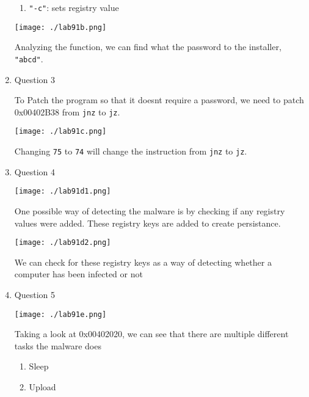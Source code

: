 \documentclass[11pt]{article}
\begin{document}
\begin{enumerate}
\begin{enumerate}
\item \texttt{"-c"}: sets registry value
\end{enumerate}

\begin{center}
\texttt{[image: ./lab91b.png]}
\end{center}

Analyzing the function, we can find what the password to the installer, \texttt{"abcd"}.

\item Question 3
\label{sec:orgcbdc229}

To Patch the program so that it doesnt require a password, we need to patch 0x00402B38 from \texttt{jnz} to \texttt{jz}. 

\begin{center}
\texttt{[image: ./lab91c.png]}
\end{center}

Changing \texttt{75} to \texttt{74} will change the instruction from \texttt{jnz} to \texttt{jz}.

\item Question 4
\label{sec:orgd7ecc0d}
\begin{center}
\texttt{[image: ./lab91d1.png]}
\end{center}

One possible way of detecting the malware is by checking if any registry values were added. These registry keys are added to create persistance.

\begin{center}
\texttt{[image: ./lab91d2.png]}
\end{center}

We can check for these registry keys as a way of detecting whether a computer has been infected or not

\item Question 5
\label{sec:org31be35a}

\begin{center}
\texttt{[image: ./lab91e.png]}
\end{center}

Taking a look at 0x00402020, we can see that there are multiple different tasks the malware does

\begin{enumerate}
\item Sleep

\item Upload


\end{enumerate}
\end{enumerate}
\end{document}
